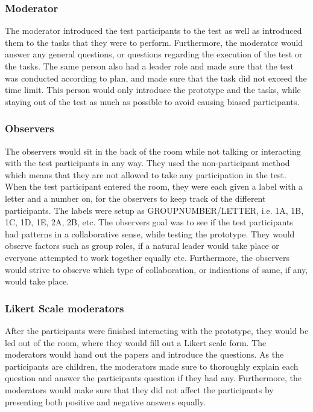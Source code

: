 \subsubsection*{Moderator}
The moderator introduced the test participants to the test  as well as introduced them to the tasks that they were to perform. Furthermore, the moderator would answer any general questions, or questions regarding the execution of the test  or the tasks. The same person also had a leader role and made sure that the test was conducted according to plan, and made sure that the task did not exceed the time limit. This person would only introduce the prototype and the tasks, while staying out of the test as much as possible to avoid causing biased participants\cite{bjoernerBog}.

\subsubsection*{Observers}
The observers would sit in the back of the room while not talking or interacting with the test participants in any way. They used the non-participant method which means that they are not allowed to take any participation in the test. When the test participant entered the room, they were each given a label with a letter and a number on, for the observers to keep track of the different participants. The labels were setup as GROUPNUMBER/LETTER, i.e. 1A, 1B, 1C, 1D, 1E, 2A, 2B, etc. The observers goal was to see if the test participants had patterns in a collaborative sense, while testing the prototype. They would observe factors such as group roles, if a natural leader would take place or everyone attempted to work together equally etc. Furthermore, the observers would strive to observe which type of collaboration, or indications of same, if any, would take place. 

\subsubsection*{Likert Scale moderators}
After the participants were finished interacting with the prototype, they would be led out of the room, where they would fill out a Likert scale form. The moderators would hand out the papers and introduce the questions. As the participants are children, the moderators made sure to thoroughly explain each question and answer the participants question if they had any. Furthermore, the moderators would make sure that they did not affect the participants by presenting both positive and negative answers equally.

